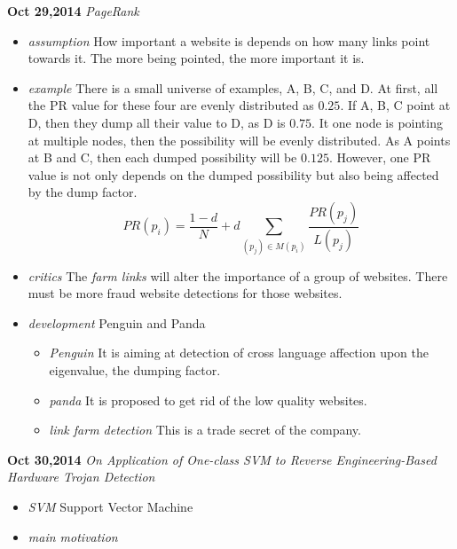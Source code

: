 \documentclass[]{article}
\begin{document}
\noindent \textbf{Oct 29,2014}
\textit{PageRank}
\indent		\begin{itemize}
                \item \textit{assumption} How important a website is depends on
                how many links point towards it. The more being pointed, the
                more important it is.
                \item \textit{example} There is a small universe of examples,
                A, B, C, and D. At first, all the PR value for these four are
                evenly distributed as $0.25$. If A, B, C point at D, then they
                dump all their value to D, as D is $0.75$. It one node is
                pointing at multiple nodes, then the possibility will be evenly
                distributed. As A points at B and C, then each dumped
                possibility will be $0.125$. However, one PR value is not only
                depends on the dumped possibility but also being affected by
                the dump factor.
                \begin{equation}
                    PR(p_{i}) = \frac{1-d}{N} + d\sum\limits_{(p_{j}) \in
                    M(p_{i})} \frac{PR(p_{j})}{L(p_{j})}
                \end{equation}
                \item \textit{critics} The \textit{farm links} will alter the
                importance of a group of websites. There must be more fraud
                website detections for those websites.
                \item \textit{development} Penguin and Panda
                    \begin{itemize}
                        \item \textit{Penguin} It is aiming at detection of
                        cross language affection upon the eigenvalue, the
                        dumping factor.
                        \item \textit{panda} It is proposed to get rid of the
                        low quality websites.
                        \item \textit{link farm detection} This is a trade
                        secret of the company.
                    \end{itemize}
            \end{itemize}

\noindent \textbf{Oct 30,2014}
\textit{On Application of One-class SVM to Reverse Engineering-Based Hardware
Trojan Detection}
\indent		\begin{itemize}

                \item \textit{SVM} Support Vector Machine
                \item \textit{main motivation}
            \end{itemize}
\end{document}
